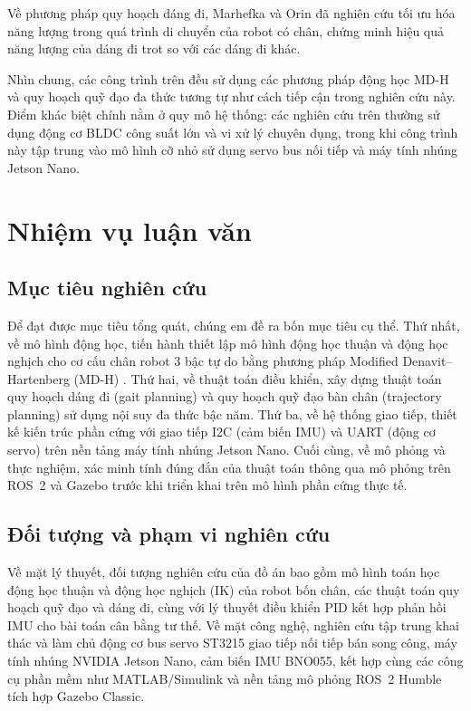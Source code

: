 Về phương pháp quy hoạch dáng đi, Marhefka và Orin \cite{marhefka1999} đã nghiên cứu tối ưu hóa năng lượng trong quá trình di chuyển của robot có chân, chứng minh hiệu quả năng lượng của dáng đi trot so với các dáng đi khác.

Nhìn chung, các công trình trên đều sử dụng các phương pháp động học MD-H \cite{denavit1955} và quy hoạch quỹ đạo đa thức tương tự như cách tiếp cận trong nghiên cứu này. Điểm khác biệt chính nằm ở quy mô hệ thống: các nghiên cứu trên thường sử dụng động cơ BLDC công suất lớn và vi xử lý chuyên dụng, trong khi công trình này tập trung vào mô hình cỡ nhỏ sử dụng servo bus nối tiếp và máy tính nhúng Jetson Nano.



\section{Nhiệm vụ luận văn}

\subsection{Mục tiêu nghiên cứu}

Để đạt được mục tiêu tổng quát, chúng em đề ra bốn mục tiêu cụ thể. Thứ nhất, về mô hình động học, tiến hành thiết lập mô hình động học thuận và động học nghịch cho cơ cấu chân robot 3 bậc tự do bằng phương pháp Modified Denavit--Hartenberg (MD-H) \cite{denavit1955}. Thứ hai, về thuật toán điều khiển, xây dựng thuật toán quy hoạch dáng đi (gait planning) và quy hoạch quỹ đạo bàn chân (trajectory planning) sử dụng nội suy đa thức bậc năm. Thứ ba, về hệ thống giao tiếp, thiết kế kiến trúc phần cứng với giao tiếp I2C (cảm biến IMU) và UART (động cơ servo) trên nền tảng máy tính nhúng Jetson Nano. Cuối cùng, về mô phỏng và thực nghiệm, xác minh tính đúng đắn của thuật toán thông qua mô phỏng trên ROS~2 và Gazebo trước khi triển khai trên mô hình phần cứng thực tế.

\subsection{Đối tượng và phạm vi nghiên cứu}

Về mặt lý thuyết, đối tượng nghiên cứu của đồ án bao gồm mô hình toán học động học thuận và động học nghịch (IK) của robot bốn chân, các thuật toán quy hoạch quỹ đạo và dáng đi, cùng với lý thuyết điều khiển PID kết hợp phản hồi IMU cho bài toán cân bằng tư thế. Về mặt công nghệ, nghiên cứu tập trung khai thác và làm chủ động cơ bus servo ST3215 giao tiếp nối tiếp bán song công, máy tính nhúng NVIDIA Jetson Nano, cảm biến IMU BNO055, kết hợp cùng các công cụ phần mềm như MATLAB/Simulink và nền tảng mô phỏng ROS~2 Humble tích hợp Gazebo Classic.

